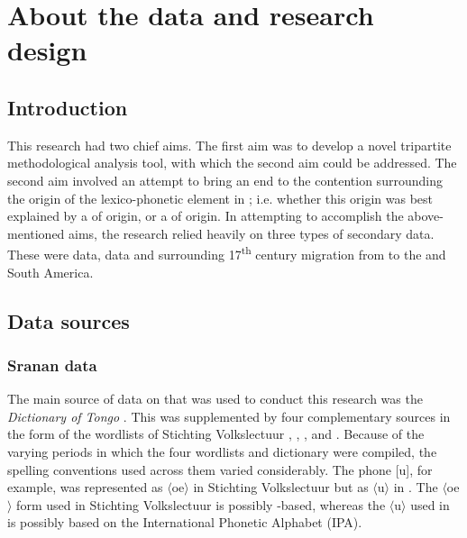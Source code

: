 \chapter{About the data and research design}\label{ch:3}

\section{Introduction}
This research had two chief aims. The first aim was to develop a novel tripartite methodological analysis tool, with which the second aim could be addressed. The second aim involved an attempt to bring an end to the contention surrounding the origin of the  lexico-phonetic element in ; i.e. whether this origin was best explained by a  of origin, or a  of origin. In attempting to accomplish the above-mentioned aims, the research relied heavily on three types of secondary data. These were  data,   data and  surrounding 17\textsuperscript{th} century migration from  to the  and South America.

\section{Data sources}\label{3.2}
\subsection{Sranan data} \label{3.2.1}
The main source of data on  that was used to conduct this research was the \emph{Dictionary of  Tongo} \citep{Wilner07, Wilner03, Wilner92}. This was supplemented by four complementary sources in the form of the wordlists of Stichting Volkslectuur \citep{Stichting80},  \citet{Schumann83}, \citet{Fermin69}, and \citet{Herlein18}. Because of the varying periods in which the four wordlists and dictionary were compiled, the spelling conventions used across them varied considerably. The phone [u], for example, was represented as $\langle$oe$\rangle$ in Stichting Volkslectuur  \citep{Stichting80} but as $\langle$u$\rangle$ in  \citet{Wilner03}. The $\langle$oe$\rangle$ form used in Stichting Volkslectuur  \citep{Stichting80} is possibly -based, whereas the $\langle$u$\rangle$ used in  \citet{Wilner03} is possibly based on the International Phonetic Alphabet (IPA).

